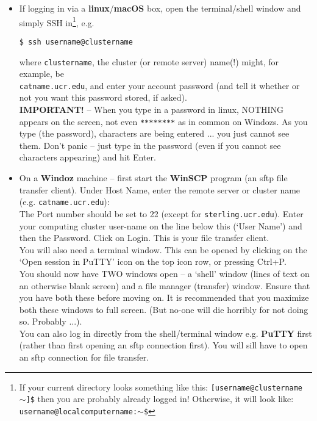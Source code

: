 \begin{itemize}
\vspace{1mm}
\item If logging in via a \textbf{linux}/\textbf{macOS} box, open the terminal/shell window and simply SSH in\footnote{If your current directory looks something like this: \texttt{[username@clustername \(\sim\)]\$}
then you are probably already logged in! Otherwise, it will look like: \texttt{username@localcomputername:\(\sim\)\$}}, e.g.

\vspace{-1mm}
\begin{verbatim}
$ ssh username@clustername
\end{verbatim}
\vspace{-1mm}

where \texttt{clustername}, the cluster (or remote server) name(!) might, for example, be
\\\texttt{catname.ucr.edu}, and enter your  account password (and tell it whether or not you want this password stored, if asked).
\vspace{1mm}
\\\textbf{IMPORTANT!} -- When you type in a password in linux, NOTHING appears on the screen, not even \texttt{********} as in common on Windozs. As you type (the password), characters are being entered ... you just cannot see them. Don't panic -- just type in the password (even if you cannot see characters appearing) and hit \textsf{\scriptsize Enter}.

\vspace{1mm}
\item On a \textbf{Windoz} machine – first start the \textbf{WinSCP} program (an sftp file transfer client). Under \textsf{\footnotesize Host Name}, enter the remote server or cluster name (e.g. \texttt{catname.ucr.edu}):
\\The \textsf{\footnotesize Port number} should be set to \textsf{\footnotesize 22} (except for \texttt{sterling.ucr.edu}). Enter your computing cluster user-name on the line below this (‘User Name’) and then the Password. Click on Login. This is your file transfer client.
\\You will also need a terminal window. This can be opened by clicking on the ‘\textsf{\footnotesize Open session in PuTTY}’ icon on the top icon row, or pressing \textsf{\footnotesize Ctrl+P}. \\You should now have TWO windows open – a ‘shell’ window (lines of text on an otherwise blank screen) and a file manager (transfer) window. Ensure that you have both these before moving on. It is recommended that you maximize both these windows to full screen. (But no-one will die horribly for not doing so. Probably ...).
\\ You can also log in directly from the shell/terminal window e.g. \textbf{PuTTY} first (rather than first opening an sftp connection first).
 You will sill have to open an sftp connection for file transfer.
\end{itemize}


